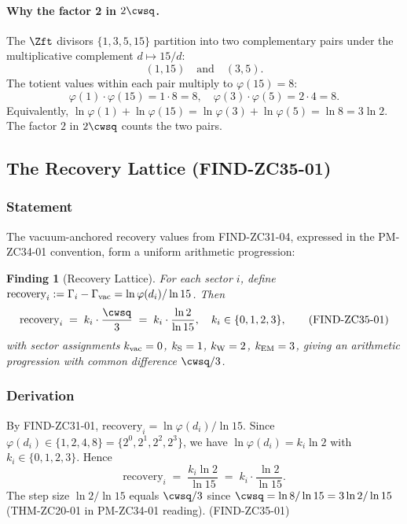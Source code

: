 \documentclass[12pt, a4paper]{article}
\newtheorem{finding}{Finding}[section]
\begin{document}
\paragraph{Why the factor 2 in $2\cwsq$.}
The $\Zft$ divisors $\{1,3,5,15\}$ partition into two complementary
pairs under the multiplicative complement $d \mapsto 15/d$:
\[
  (1,15)\quad\text{and}\quad (3,5).
\]
The totient values within each pair multiply to $\varphi(15) = 8$:
\[
  \varphi(1)\cdot\varphi(15) = 1 \cdot 8 = 8,
  \quad
  \varphi(3)\cdot\varphi(5) = 2 \cdot 4 = 8.
\]
Equivalently, $\ln\varphi(1) + \ln\varphi(15) = \ln\varphi(3) + \ln\varphi(5)
= \ln 8 = 3\ln 2$. The factor $2$ in $2\cwsq$ counts the two pairs.

\subsection{The Recovery Lattice (FIND-ZC35-01)}
\label{sec:find-zc35-01}

\subsubsection{Statement}

The vacuum-anchored recovery values from FIND-ZC31-04, expressed in
the PM-ZC34-01 convention, form a uniform arithmetic progression:

\begin{finding}[Recovery Lattice]\label{find:zc35-01}
For each sector $i$, define
$\text{recovery}_i := \Gamma_i - \Gamma_{\rm vac} = \ln\varphi(d_i)/\ln 15$.
Then
\begin{equation}
  \text{recovery}_i \;=\; k_i \cdot \frac{\cwsq}{3}
  \;=\; k_i \cdot \frac{\ln 2}{\ln 15},
  \quad k_i \in \{0,1,2,3\},
  \tag{FIND-ZC35-01}\label{eq:find-zc35-01}
\end{equation}
with sector assignments $k_{\rm vac}=0$, $k_{\rm S}=1$, $k_{\rm W}=2$,
$k_{\rm EM}=3$, giving an arithmetic progression with common difference
$\cwsq/3$.
\end{finding}

\subsubsection{Derivation}

\begin{derivedbox}[title={FIND-ZC35-01: Derivation}]
By FIND-ZC31-01,
$\text{recovery}_i = \ln\varphi(d_i)/\ln 15$. Since $\varphi(d_i) \in
\{1,2,4,8\} = \{2^0,2^1,2^2,2^3\}$, we have
$\ln\varphi(d_i) = k_i \ln 2$ with $k_i \in \{0,1,2,3\}$. Hence
\[
  \text{recovery}_i
  \;=\; \frac{k_i \ln 2}{\ln 15}
  \;=\; k_i \cdot \frac{\ln 2}{\ln 15}.
\]
The step size $\ln 2/\ln 15$ equals $\cwsq/3$ since
$\cwsq = \ln 8/\ln 15 = 3 \ln 2/\ln 15$ (THM-ZC20-01 in PM-ZC34-01
reading).
\hfill\textup{(FIND-ZC35-01)}
\end{derivedbox}
\end{document}
